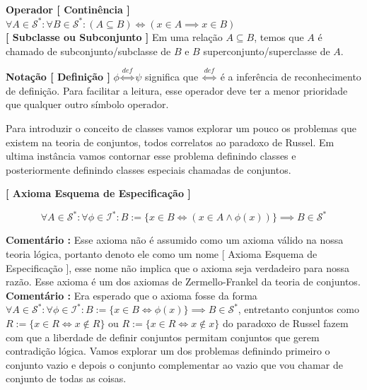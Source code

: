 \documentclass[10pt,a4paper]{report}
\begin{document}
\textbf{Operador [ Continência ]} $ \forall A \in \mathcal{S}^* : \forall B \in \mathcal{S}^* : (A \subseteq B) \iff ( x \in A \implies x \in B ) $\\

\textbf{[ Subclasse ou Subconjunto ]} Em uma relação $A \subseteq B$, temos que $A$ é chamado de subconjunto/subclasse de $B$ e $B$ superconjunto/superclasse de $A$.

\hspace{\baselineskip}

\textbf{Notação [ Definição ]} $ \phi \overset{def}{\iff} \psi $ significa que $\overset{def}{\iff}$ é a inferência de reconhecimento de definição. Para facilitar a leitura, esse operador deve ter a menor prioridade que qualquer outro símbolo operador.

\hspace{\baselineskip}

Para introduzir o conceito de classes vamos explorar um pouco os problemas que existem na teoria de conjuntos, todos correlatos ao paradoxo de Russel. Em ultima instância vamos contornar esse problema definindo classes e posteriormente definindo classes especiais chamadas de conjuntos.

\hspace{\baselineskip}

\textbf{[ Axioma Esquema de Especificação ]} 

$$\forall A \in \mathcal{S}^* : \forall \phi \in \mathcal{I}^* : B:= \{ x \in B \iff (x \in A \wedge \phi(x) ) \} \implies B \in \mathcal{S}^* $$

\textbf{Comentário :} Esse axioma não é assumido como um axioma válido na nossa teoria lógica, portanto denoto ele como um nome [ Axioma Esquema de Especificação ], esse nome não implica que o axioma seja verdadeiro para nossa razão. Esse axioma é um dos axiomas de Zermello-Frankel da teoria de conjuntos.\\

\textbf{Comentário :} Era esperado que o axioma fosse da forma $ \forall A \in \mathcal{S}^* : \forall \phi \in \mathcal{I}^* : B:= \{ x \in B \iff \phi(x) \} \implies B \in \mathcal{S}^* $, entretanto conjuntos como $ R:=\{ x \in R \iff x \notin R \} $ ou $ R:=\{ x \in R \iff x \notin x \} $ do paradoxo de Russel fazem com que a liberdade de definir conjuntos permitam conjuntos que gerem contradição lógica. Vamos explorar um dos problemas definindo primeiro o conjunto vazio e depois o conjunto complementar ao vazio que vou chamar de conjunto de todas as coisas.\\
\end{document}
